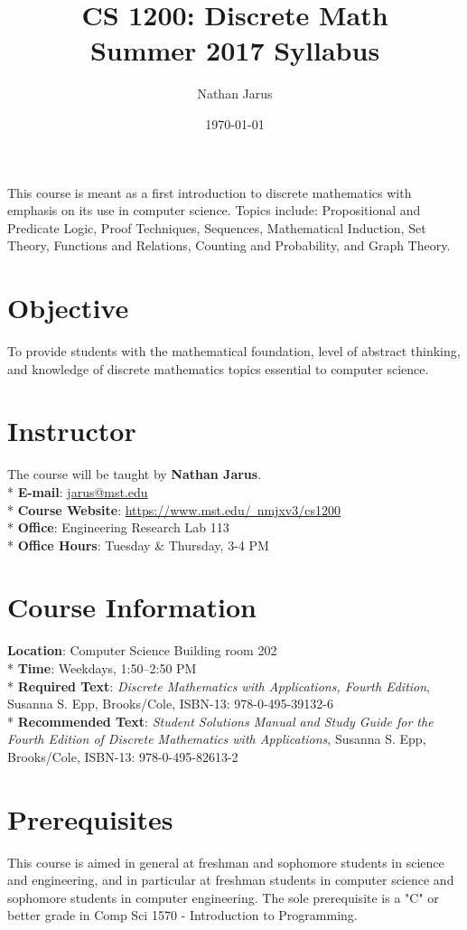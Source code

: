 \documentclass{article}
\title{CS 1200: Discrete Math \\ Summer 2017 Syllabus}
\date{\today}
\author{Nathan Jarus}
\begin{document}
\maketitle

This course is meant as a first introduction to discrete mathematics with emphasis on its use in computer science. Topics include: Propositional and Predicate Logic, Proof Techniques, Sequences, Mathematical Induction, Set Theory, Functions and Relations, Counting and Probability, and Graph Theory.

\section{Objective}

To provide students with the mathematical foundation, level of abstract thinking, and knowledge of discrete mathematics topics essential to computer science.

\section{Instructor}
The course will be taught by \textbf{Nathan Jarus}. \\*
\textbf{E-mail}: \href{mailto:jarus@mst.edu}{jarus@mst.edu} \\*
\textbf{Course Website}: \href{https://www.mst.edu/~nmjxv3/cs1200}{https://www.mst.edu/~nmjxv3/cs1200} \\*
\textbf{Office}: Engineering Research Lab 113 \\*
\textbf{Office Hours}: Tuesday \& Thursday, 3-4 PM\\

\section{Course Information}
\textbf{Location}: Computer Science Building room 202\\*
\textbf{Time}: Weekdays, 1:50--2:50 PM\\*
\textbf{Required Text}: \textit{Discrete Mathematics with Applications, Fourth Edition}, Susanna S. Epp, Brooks/Cole, ISBN-13: 978-0-495-39132-6\\*
\textbf{Recommended Text}: \textit{Student Solutions Manual and Study Guide for the Fourth Edition of Discrete Mathematics with Applications}, Susanna S. Epp, Brooks/Cole, ISBN-13: 978-0-495-82613-2\\

\section{Prerequisites}
This course is aimed in general at freshman and sophomore students in science and engineering, and in particular at freshman students in computer science and sophomore students in computer engineering. The sole prerequisite is a "C" or better grade in Comp Sci 1570 - Introduction to Programming.
\end{document}
